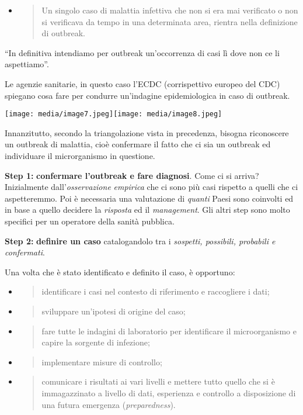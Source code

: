 \documentclass[]{article}
\begin{document}
\begin{itemize}
\item
  \begin{quote}
  Un singolo caso di malattia infettiva che non si era mai verificato o
  non si verificava da tempo in una determinata area, rientra nella
  definizione di outbreak.
  \end{quote}
\end{itemize}

``In definitiva intendiamo per outbreak un'occorrenza di casi lì dove
non ce li aspettiamo''.

Le agenzie sanitarie, in questo caso l'ECDC (corrispettivo europeo del
CDC) spiegano cosa fare per condurre un'indagine epidemiologica in caso
di outbreak.

\texttt{[image: media/image7.jpeg]}\texttt{[image: media/image8.jpeg]}

Innanzitutto, secondo la triangolazione vista in precedenza, bisogna
riconoscere un outbreak di malattia, cioè confermare il fatto che ci sia
un outbreak ed individuare il microrganismo in questione.

\textbf{Step 1:} \textbf{confermare l'outbreak e fare diagnosi}. Come ci
si arriva? Inizialmente dall'\emph{osservazione} \emph{empirica} che ci
sono più casi rispetto a quelli che ci aspetteremmo. Poi è necessaria
una valutazione di \emph{quanti} Paesi sono coinvolti ed in base a
quello decidere la \emph{risposta} ed il \emph{management}. Gli altri
step sono molto specifici per un operatore della sanità pubblica.

\textbf{Step 2:} \textbf{definire un caso} catalogandolo tra i
\emph{sospetti, possibili, probabili e confermati}.

Una volta che è stato identificato e definito il caso, è opportuno:

\begin{itemize}
\item
  \begin{quote}
  identificare i casi nel contesto di riferimento e raccogliere i dati;
  \end{quote}
\item
  \begin{quote}
  sviluppare un'ipotesi di origine del caso;
  \end{quote}
\item
  \begin{quote}
  fare tutte le indagini di laboratorio per identificare il
  microorganismo e capire la sorgente di infezione;
  \end{quote}
\item
  \begin{quote}
  implementare misure di controllo;
  \end{quote}
\item
  \begin{quote}
  comunicare i risultati ai vari livelli e mettere tutto quello che si è
  immagazzinato a livello di dati, esperienza e controllo a disposizione
  di una futura emergenza (\emph{preparedness}).
  \end{quote}
\end{itemize}
\end{document}
